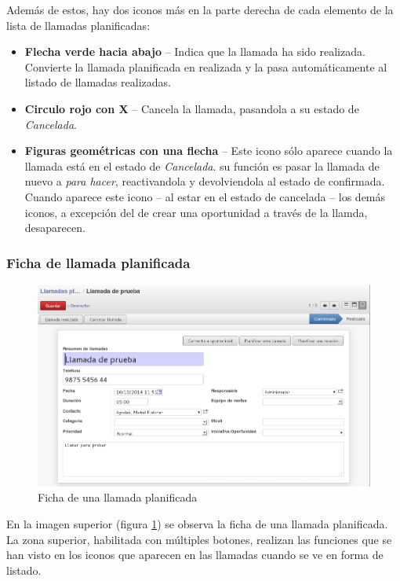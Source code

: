 Además de estos, hay dos iconos más en la parte derecha de cada elemento de la lista de llamadas planificadas:

\begin{itemize}
  \item \textbf{Flecha verde hacia abajo} -- Indica que la llamada ha sido realizada. Convierte la llamada planificada en realizada y 
                           la pasa automáticamente al listado de llamadas realizadas.
  \item \textbf{Circulo rojo con X} -- Cancela la llamada, pasandola a su estado de \emph{Cancelada}.
  \item \textbf{Figuras geométricas con una flecha} -- Este icono sólo aparece cuando la llamada está en el estado de \emph{Cancelada}.
                           su función es pasar la llamada de nuevo a \emph{para hacer}, reactivandola y devolviendola al estado de 
                           confirmada. Cuando aparece este icono -- al estar en el estado de cancelada -- los demás iconos, a excepción 
                           del de crear una oportunidad a través de la llamda, desaparecen.
\end{itemize}


\subsubsection{Ficha de llamada planificada}

\begin{figure}[H]
\includegraphics[width=\textwidth]{ventas/img/ven_llaindividual.png}
\caption{Ficha de una llamada planificada}
\label{ven:llaindividual}
\end{figure}

En la imagen superior (figura \ref{ven:llaindividual}) se observa la ficha de una llamada planificada. La zona superior, habilitada con
múltiples botones, realizan las funciones que se han visto en los iconos que aparecen en las llamadas cuando se ve en forma de listado.

